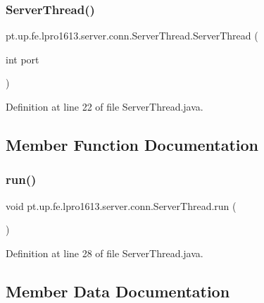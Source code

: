 \subsubsection{\texorpdfstring{Server\+Thread()}{ServerThread()}}
{\footnotesize\ttfamily pt.\+up.\+fe.\+lpro1613.\+server.\+conn.\+Server\+Thread.\+Server\+Thread (\begin{DoxyParamCaption}\item[{int}]{port }\end{DoxyParamCaption})}



Definition at line 22 of file Server\+Thread.\+java.



\subsection{Member Function Documentation}
\hypertarget{classpt_1_1up_1_1fe_1_1lpro1613_1_1server_1_1conn_1_1_server_thread_a78326abfc2bd35d8d4d3ac214ed3056c}{}\label{classpt_1_1up_1_1fe_1_1lpro1613_1_1server_1_1conn_1_1_server_thread_a78326abfc2bd35d8d4d3ac214ed3056c} 
\subsubsection{\texorpdfstring{run()}{run()}}
{\footnotesize\ttfamily void pt.\+up.\+fe.\+lpro1613.\+server.\+conn.\+Server\+Thread.\+run (\begin{DoxyParamCaption}{ }\end{DoxyParamCaption})}



Definition at line 28 of file Server\+Thread.\+java.



\subsection{Member Data Documentation}
\hypertarget{classpt_1_1up_1_1fe_1_1lpro1613_1_1server_1_1conn_1_1_server_thread_a89129be61d7282900277bab472083325}{}\label{classpt_1_1up_1_1fe_1_1lpro1613_1_1server_1_1conn_1_1_server_thread_a89129be61d7282900277bab472083325} 
